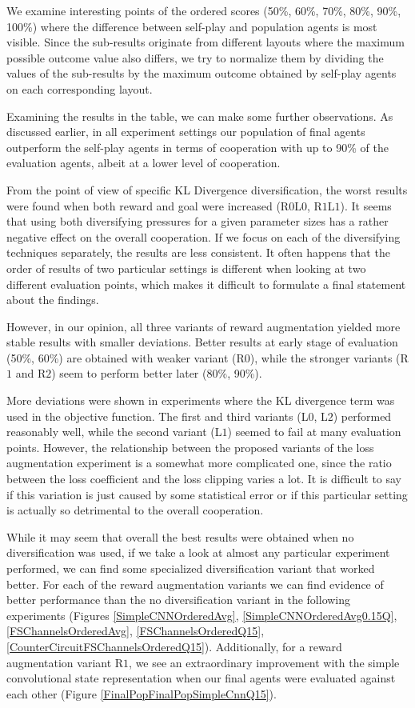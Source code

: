 We examine interesting points of the ordered scores (50\%, 60\%, 70\%, 80\%, 90\%, 100\%) where the difference between self-play and population agents is most visible.
Since the sub-results originate from different layouts where the maximum possible outcome value also differs, we try to normalize them by dividing the values of the sub-results by the maximum outcome obtained by self-play agents on each corresponding layout.

Examining the results in the table, we can make some further observations.
As discussed earlier, in all experiment settings our population of final agents outperform the self-play agents in terms of cooperation with up to 90\% of the evaluation agents, albeit at a lower level of cooperation.

From the point of view of specific KL Divergence diversification, the worst results were found when both reward and goal were increased (R$0$L$0$, R$1$L$1$).
It seems that using both diversifying pressures for a given parameter sizes has a rather negative effect on the overall cooperation.
If we focus on each of the diversifying techniques separately, the results are less consistent.
It often happens that the order of results of two particular settings is different when looking at two different evaluation points, which makes it difficult to formulate a final statement about the findings.

However, in our opinion, all three variants of reward augmentation yielded more stable results with smaller deviations.
Better results at early stage of evaluation (50\%, 60\%) are obtained with weaker variant (R$0$), while the stronger variants (R$1$ and R$2$) seem to perform better later (80\%, 90\%).


More deviations were shown in experiments where the KL divergence term was used in the objective function.
The first and third variants (L$0$, L$2$) performed reasonably well, while the second variant (L$1$) seemed to fail at many evaluation points.
However, the relationship between the proposed variants of the loss augmentation experiment is a somewhat more complicated one, since the ratio between the loss coefficient and the loss clipping varies a lot. 
It is difficult to say if this variation is just caused by some statistical error or if this particular setting is actually so detrimental to the overall cooperation.

While it may seem that overall the best results were obtained when no diversification was used, if we take a look at almost any particular experiment performed, we can find some specialized diversification variant that worked better.
For each of the reward augmentation variants we can find evidence of better performance than the no diversification variant in the following experiments (Figures \ref{SimpleCNNOrderedAvg}, \ref{SimpleCNNOrderedAvg0.15Q}, \ref{FSChannelsOrderedAvg}, \ref{FSChannelsOrderedQ15}, \ref{CounterCircuitFSChannelsOrderedQ15}).
Additionally, for a reward augmentation variant R$1$, we see an extraordinary improvement with the simple convolutional state representation when our final agents were evaluated against each other (Figure \ref{FinalPopFinalPopSimpleCnnQ15}). 

